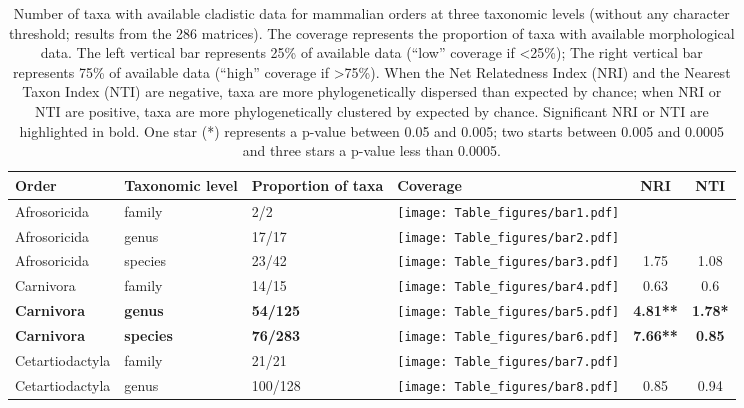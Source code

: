 \begin{longtable}{lL{1.8cm}C{2cm}lcc}
\caption{Number of taxa with available cladistic data for mammalian orders at three taxonomic levels (without any character threshold; results from the 286 matrices). The coverage represents the proportion of taxa with available morphological data. The left vertical bar represents 25\% of available data (``low'' coverage if \textless 25\%); The right vertical bar represents 75\% of available data (``high'' coverage if \textgreater 75\%). When the Net Relatedness Index (NRI) and the Nearest Taxon Index (NTI) are negative, taxa are more phylogenetically dispersed than expected by chance; when NRI or NTI are positive, taxa are more phylogenetically clustered by expected by chance. Significant NRI or NTI are highlighted in bold. One star (*) represents a p-value between 0.05 and 0.005; two starts between 0.005 and 0.0005 and three stars a p-value less than 0.0005.} \\ 
  \hline
Order & Taxonomic level & Proportion of taxa & Coverage & NRI & NTI \\ 
  \hline
Afrosoricida & family & 2/2 & \texttt{[image: Table\_figures/bar1.pdf]} &   &   \\ 
  Afrosoricida & genus & 17/17 & \texttt{[image: Table\_figures/bar2.pdf]} &   &   \\ 
  Afrosoricida & species & 23/42 & \texttt{[image: Table\_figures/bar3.pdf]} & 1.75 & 1.08 \\ 
  Carnivora & family & 14/15 & \texttt{[image: Table\_figures/bar4.pdf]} & 0.63 & 0.6 \\ 
  \textbf{Carnivora} & \textbf{genus} & \textbf{54/125} & \texttt{[image: Table\_figures/bar5.pdf]} & \textbf{4.81**} & \textbf{1.78*} \\ 
  \textbf{Carnivora} & \textbf{species} & \textbf{76/283} & \texttt{[image: Table\_figures/bar6.pdf]} & \textbf{7.66**} & \textbf{0.85} \\ 
  Cetartiodactyla & family & 21/21 & \texttt{[image: Table\_figures/bar7.pdf]} &   &   \\ 
  Cetartiodactyla & genus & 100/128 & \texttt{[image: Table\_figures/bar8.pdf]} & 0.85 & 0.94 \\ 

\end{longtable}
